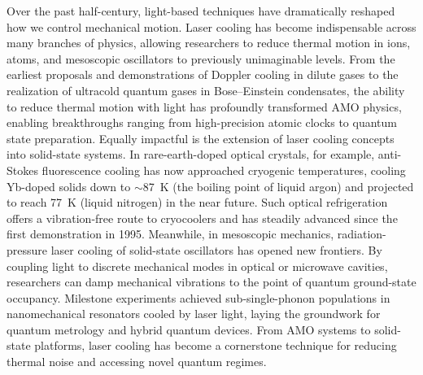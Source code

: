 Over the past half-century, light-based techniques have dramatically reshaped how we control mechanical motion. Laser cooling has become indispensable across many branches of physics, allowing researchers to reduce thermal motion in ions, atoms, and mesoscopic oscillators to previously unimaginable levels. From the earliest proposals and demonstrations of Doppler cooling in dilute gases \cite{hansch1975cooling} to the realization of ultracold quantum gases in Bose–Einstein condensates\cite{anderson1995observation}, the ability to reduce thermal motion with light has profoundly transformed \ac{AMO} physics, enabling breakthroughs ranging from high-precision atomic clocks to quantum state preparation\cite{ludlow2015optical}. Equally impactful is the extension of laser cooling concepts into solid-state systems. In rare-earth-doped optical crystals, for example, anti-Stokes fluorescence cooling has now approached cryogenic temperatures, cooling Yb-doped solids down to \(\sim\)\SI{87}{\kelvin} (the boiling point of liquid argon) and projected to reach \SI{77}{\kelvin} (liquid nitrogen) in the near future. \cite{meng2018realization} Such optical refrigeration offers a vibration-free route to cryocoolers and has steadily advanced since the first demonstration in 1995. \cite{epstein1995observation} Meanwhile, in mesoscopic mechanics, radiation-pressure laser cooling of solid-state oscillators has opened new frontiers. By coupling light to discrete mechanical modes in optical or microwave cavities, researchers can damp mechanical vibrations to the point of quantum ground-state occupancy. \cite{chan2011laser} Milestone experiments achieved sub-single-phonon populations in nanomechanical resonators cooled by laser light\cite{chan2011laser}, laying the groundwork for quantum metrology and hybrid quantum devices. From \ac{AMO} systems to solid-state platforms, laser cooling has become a cornerstone technique for reducing thermal noise and accessing novel quantum regimes.

